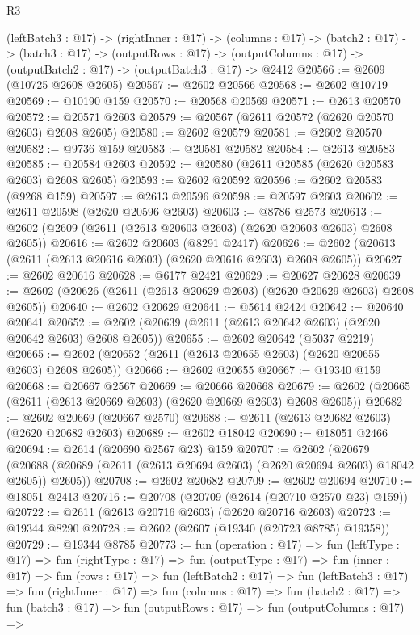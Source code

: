 \begin{lexlean}{R3}
\begin{coremodule}
  (leftBatch3 : @17) ->
  (rightInner : @17) ->
  (columns : @17) ->
  (batch2 : @17) ->
  (batch3 : @17) ->
  (outputRows : @17) ->
  (outputColumns : @17) -> (outputBatch2 : @17) -> (outputBatch3 : @17) -> @2412
@20566 := @2609 (@10725 @2608 @2605)
@20567 := @2602 @20566
@20568 := @2602 @10719
@20569 := @10190 @159
@20570 := @20568 @20569
@20571 := @2613 @20570
@20572 := @20571 @2603
@20579 := @20567 (@2611 @20572 (@2620 @20570 @2603) @2608 @2605)
@20580 := @2602 @20579
@20581 := @2602 @20570
@20582 := @9736 @159
@20583 := @20581 @20582
@20584 := @2613 @20583
@20585 := @20584 @2603
@20592 := @20580 (@2611 @20585 (@2620 @20583 @2603) @2608 @2605)
@20593 := @2602 @20592
@20596 := @2602 @20583 (@9268 @159)
@20597 := @2613 @20596
@20598 := @20597 @2603
@20602 := @2611 @20598 (@2620 @20596 @2603)
@20603 := @8786 @2573
@20613 := @2602 (@2609 (@2611 (@2613 @20603 @2603) (@2620 @20603 @2603) @2608 @2605))
@20616 := @2602 @20603 (@8291 @2417)
@20626 := @2602 (@20613 (@2611 (@2613 @20616 @2603) (@2620 @20616 @2603) @2608 @2605))
@20627 := @2602 @20616
@20628 := @6177 @2421
@20629 := @20627 @20628
@20639 := @2602 (@20626 (@2611 (@2613 @20629 @2603) (@2620 @20629 @2603) @2608 @2605))
@20640 := @2602 @20629
@20641 := @5614 @2424
@20642 := @20640 @20641
@20652 := @2602 (@20639 (@2611 (@2613 @20642 @2603) (@2620 @20642 @2603) @2608 @2605))
@20655 := @2602 @20642 (@5037 @2219)
@20665 := @2602 (@20652 (@2611 (@2613 @20655 @2603) (@2620 @20655 @2603) @2608 @2605))
@20666 := @2602 @20655
@20667 := @19340 @159
@20668 := @20667 @2567
@20669 := @20666 @20668
@20679 := @2602 (@20665 (@2611 (@2613 @20669 @2603) (@2620 @20669 @2603) @2608 @2605))
@20682 := @2602 @20669 (@20667 @2570)
@20688 := @2611 (@2613 @20682 @2603) (@2620 @20682 @2603)
@20689 := @2602 @18042
@20690 := @18051 @2466
@20694 := @2614 (@20690 @2567 @23) @159
@20707 := @2602
    (@20679 (@20688 (@20689 (@2611 (@2613 @20694 @2603) (@2620 @20694 @2603) @18042 @2605)) @2605))
@20708 := @2602 @20682
@20709 := @2602 @20694
@20710 := @18051 @2413
@20716 := @20708 (@20709 (@2614 (@20710 @2570 @23) @159))
@20722 := @2611 (@2613 @20716 @2603) (@2620 @20716 @2603)
@20723 := @19344 @8290
@20728 := @2602 (@2607 (@19340 (@20723 @8785) @19358))
@20729 := @19344 @8785
@20773 := fun (operation : @17) =>
  fun (leftType : @17) =>
  fun (rightType : @17) =>
  fun (outputType : @17) =>
  fun (inner : @17) =>
  fun (rows : @17) =>
  fun (leftBatch2 : @17) =>
  fun (leftBatch3 : @17) =>
  fun (rightInner : @17) =>
  fun (columns : @17) =>
  fun (batch2 : @17) =>
  fun (batch3 : @17) =>
  fun (outputRows : @17) =>
  fun (outputColumns : @17) =>

\end{coremodule}
\end{lexlean}
